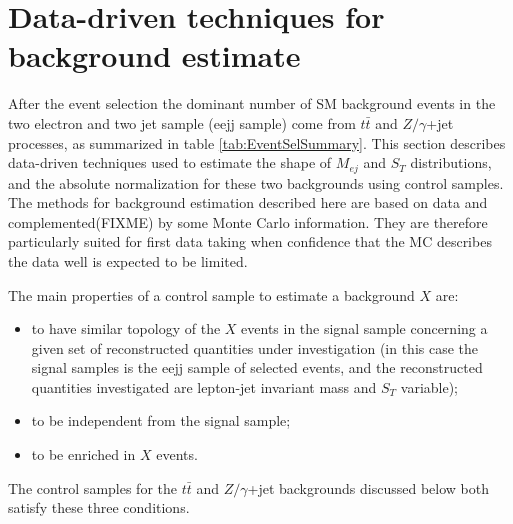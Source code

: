 % 

\section{Data-driven techniques for background estimate} \label{sec:bkgStudy}
After the event selection the dominant number of SM background events in the two electron and two jet sample (eejj sample) 
come from $t\bar{t}$ and $Z/\gamma$+jet processes, as summarized in table \ref{tab:EventSelSummary}. 
This section describes data-driven techniques used to estimate the shape of $M_{ej}$ and $S_{T}$ distributions, and the absolute 
normalization for these two backgrounds using control samples. 
The methods for background estimation described here are based on data and complemented(FIXME) by some Monte Carlo information. 
They are therefore particularly suited for first data taking when confidence that the MC describes
the data well is expected to be limited.

The main properties of a control sample to estimate a background $X$ are:
\begin{itemize}
%
\item to have similar topology of the $X$ events in the signal sample concerning a given set of 
reconstructed quantities under investigation (in this case the signal samples is the eejj sample of selected events, 
and the reconstructed quantities investigated are lepton-jet invariant mass and $S_{T}$ variable);  
%
\item to be independent from the signal sample;
%
\item to be enriched in $X$ events.
%
\end{itemize}
%
The control samples for the $t\bar{t}$ and $Z/\gamma$+jet backgrounds discussed below both satisfy these three conditions.



